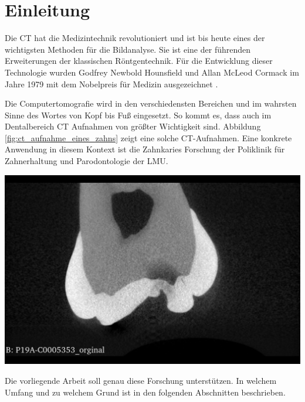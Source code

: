 \chapter{Einleitung}
\label{chap:einleitung} Die \ac{CT} hat die Medizintechnik revolutioniert und
ist bis heute eines der wichtigsten Methoden für die Bildanalyse. Sie ist eine der
führenden Erweiterungen der klassischen Röntgentechnik. Für die Entwicklung
dieser Technologie wurden Godfrey Newbold Hounsfield und Allan McLeod Cormack im
Jahre 1979 mit dem Nobelpreis für Medizin ausgezeichnet \citep[.vgl][S.~12]{handels2000}.

\begin{minipage}{0.45\textwidth}
	Die Computertomografie wird in den verschiedensten Bereichen und im wahrsten Sinne
	des Wortes von Kopf bis Fuß eingesetzt. So kommt es, dass auch im Dentalbereich
	\ac{CT} Aufnahmen von größter Wichtigkeit sind. Abbildung \ref{fig:ct_aufnahme_eines_zahns}
	zeigt eine solche \ac{CT}-Aufnahmen. Eine konkrete Anwendung in diesem Kontext
	ist die Zahnkaries Forschung der Poliklinik für Zahnerhaltung und Parodontologie
	der \ac{LMU}.
\end{minipage}
\hfill
\begin{minipage}{0.45\textwidth}
	\centering
	\includegraphics[scale=0.2, width=\textwidth]{img/micro_ct_orginal.jpg}
	 \label{fig:ct_aufnahme_eines_zahns}
\end{minipage}

Die vorliegende Arbeit soll genau diese Forschung unterstützen. In welchem Umfang
und zu welchem Grund ist in den folgenden Abschnitten beschrieben.

